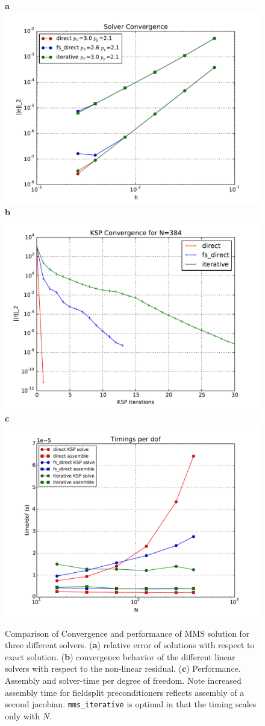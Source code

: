 \begin{figure}[htbp!]
  \centering
 \textbf{a} \includegraphics[width=.65\textwidth]{figures/Solver_comparison_convergence.pdf}\\
\textbf{b}\includegraphics[width=.65\textwidth]{figures/Solver_Comparison_ksp_convergence.pdf}\\
\textbf{c}\includegraphics[width=.65\textwidth]{figures/Solver_Comparison_normalized_solver_timing.pdf}\\
  \caption{Comparison of Convergence and performance of MMS solution
    for three different solvers.  (\textbf{a}) relative error of
    solutions with respect to exact solution. (\textbf{b}) convergence behavior
    of the different linear solvers with respect to  the non-linear
    residual. (\textbf{c}) Performance.  Assembly and solver-time per
    degree of freedom.  Note increased assembly time for fieldsplit
    preconditioners reflects assembly of a second jacobian.
    \texttt{mms\_iterative} is optimal in that the timing scales only
    with $N$.}
  \label{fig:stokes_solver_convergence_timing}
\end{figure}

